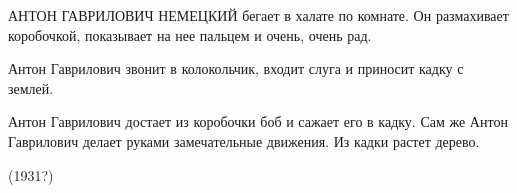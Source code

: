 АНТОН ГАВРИЛОВИЧ НЕМЕЦКИЙ бегает в халате по комнате. 
Он размахивает коробочкой, показывает на нее пальцем и очень, очень рад.

Антон Гаврилович звонит в колокольчик, входит слуга и приносит кадку с землей.

Антон Гаврилович достает из коробочки боб и сажает его в кадку. 
Сам же Антон Гаврилович  делает руками замечательные  движения. 
Из кадки растет дерево.

\begin{flushright}
(1931?)
\end{flushright}
